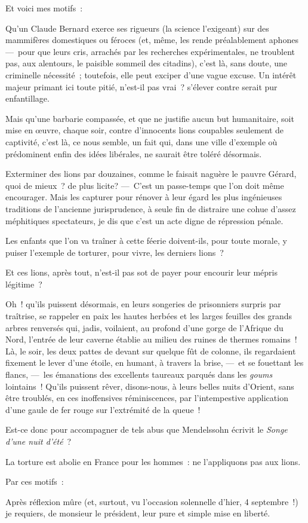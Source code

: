 \documentclass[french,twoside]{book} %
\begin{document}
Et voici mes motifs :\par
Qu’un Claude Bernard exerce ses rigueurs (la science l’exigeant) sur des mammifères   domestiques ou féroces (et, même, les rende préalablement aphones— pour que leurs cris, arrachés par les recherches expérimentales, ne troublent pas, aux alentours, le paisible sommeil des citadins), c’est là, sans doute, une criminelle nécessité ; toutefois, elle peut exciper d’une vague excuse. Un intérêt majeur primant ici toute pitié, n’est-il pas vrai ? s’élever contre serait pur enfantillage.\par
Mais qu’une barbarie compassée, et que ne justifie aucun but humanitaire, soit mise en œuvre, chaque soir, contre d’innocents lions coupables seulement de captivité, c’est là, ce nous semble, un fait qui, dans une ville d’exemple où prédominent enfin des idées libérales, ne saurait être toléré désormais.\par
Exterminer des lions par douzaines, comme le faisait naguère le pauvre Gérard, quoi de mieux ? de plus licite? — C’est un passe-temps que l’on doit même encourager. Mais les capturer pour rénover à leur égard les plus ingénieuses traditions de l’ancienne jurisprudence, à seule fin de distraire une cohue d’assez méphitiques   spectateurs, je dis que c’est un acte digne de répression pénale.\par
Les enfants que l’on va traîner à cette féerie doivent-ils, pour toute morale, y puiser l’exemple de torturer, pour vivre, les derniers lions ?\par
Et ces lions, après tout, n’est-il pas sot de payer pour encourir leur mépris légitime ?\par
Oh ! qu’ils puissent désormais, en leurs songeries de prisonniers surpris par traîtrise, se rappeler en paix les hautes herbées et les larges feuilles des grands arbres renversés qui, jadis, voilaient, au profond d’une gorge de l’Afrique du Nord, l’entrée de leur caverne établie au milieu des ruines de thermes romains ! Là, le soir, les deux pattes de devant sur quelque fût de colonne, ils regardaient fixement le lever d’une étoile, en humant, à travers la brise, — et se fouettant les flancs, — les émanations des excellents taureaux parqués dans les \emph{goums} lointains ! Qu’ils puissent rêver, disons-nous, à leurs belles nuits d’Orient, sans être troublés, en ces inoffensives réminiscences, par l’intempestive application d’une   gaule de fer rouge sur l’extrémité de la queue !\par
Est-ce donc pour accompagner de tels abus que Mendelssohn écrivit le \emph{Songe d’une nuit d’été} ?\par
La torture est abolie en France pour les hommes : ne l’appliquons pas aux lions.\par
Par ces motifs :\par
Après réflexion mûre (et, surtout, vu l’occasion solennelle d’hier, 4 septembre !) je requiers, de monsieur le président, leur pure et simple mise en liberté.
\end{document}
